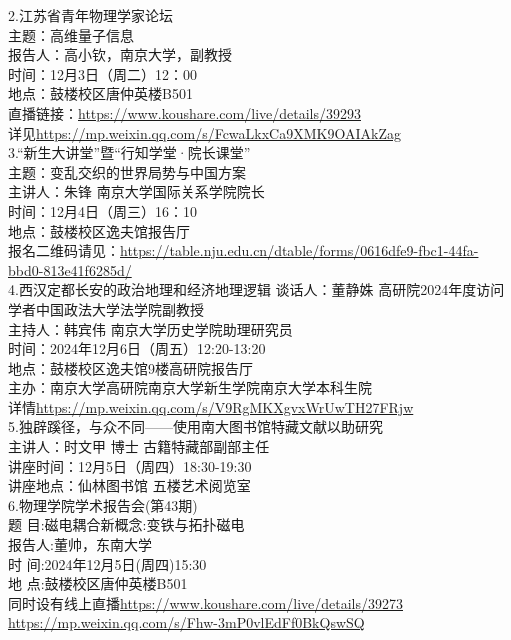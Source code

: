 \documentclass[letterpaper, 12pt]{article}
\begin{document}
\begin{multicols}{2}
2.江苏省青年物理学家论坛\\
主题：高维量子信息\\
报告人：高小钦，南京大学，副教授\\
时间：12月3日（周二）12：00\\
地点：鼓楼校区唐仲英楼B501\\
直播链接：\url{https://www.koushare.com/live/details/39293}\\
详见\url{https://mp.weixin.qq.com/s/FcwaLkxCa9XMK9OAIAkZag}\\

3.“新生大讲堂”暨“行知学堂·院长课堂”\\
主题：变乱交织的世界局势与中国方案\\
主讲人：朱锋 南京大学国际关系学院院长\\
时间：12月4日（周三）16：10\\
地点：鼓楼校区逸夫馆报告厅\\
报名二维码请见：\url{https://table.nju.edu.cn/dtable/forms/0616dfe9-fbc1-44fa-bbd0-813e41f6285d/}\\

4.西汉定都长安的政治地理和经济地理逻辑
谈话人：董静姝 高研院2024年度访问学者中国政法大学法学院副教授\\
主持人：韩宾伟 南京大学历史学院助理研究员\\
时间：2024年12月6日（周五）12:20-13:20\\
地点：鼓楼校区逸夫馆9楼高研院报告厅\\
主办：南京大学高研院南京大学新生学院南京大学本科生院\\
详情\url{https://mp.weixin.qq.com/s/V9RgMKXgvxWrUwTH27FRjw}\\

5.独辟蹊径，与众不同——使用南大图书馆特藏文献以助研究\\
主讲人：时文甲 博士 古籍特藏部副部主任\\
讲座时间：12月5日（周四）18:30-19:30\\
讲座地点：仙林图书馆 五楼艺术阅览室\\

6.物理学院学术报告会(第43期)\\
题 目:磁电耦合新概念:变铁与拓扑磁电\\
报告人:董帅，东南大学\\
时 间:2024年12月5日(周四)15:30\\
地 点:鼓楼校区唐仲英楼B501\\
同时设有线上直播\url{https://www.koushare.com/live/details/39273}\\
\url{https://mp.weixin.qq.com/s/Fhw-3mP0vlEdFf0BkQswSQ}\\


\end{multicols}
\end{document}
